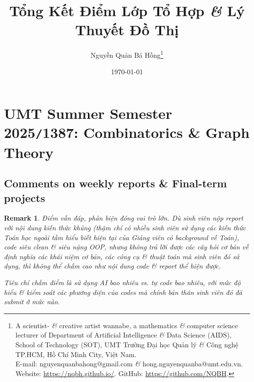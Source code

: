 \documentclass{article}
\title{Tổng Kết Điểm Lớp Tổ Hợp {\it\&} Lý Thuyết Đồ Thị}
\author{Nguyễn Quản Bá Hồng\footnote{A scientist- {\it\&} creative artist wannabe, a mathematics {\it\&} computer science lecturer of Department of Artificial Intelligence {\it\&} Data Science (AIDS), School of Technology (SOT), UMT Trường Đại học Quản lý {\it\&} Công nghệ TP.HCM, Hồ Chí Minh City, Việt Nam.\\E-mail: {\sf nguyenquanbahong@gmail.com} {\it\&} {\sf hong.nguyenquanba@umt.edu.vn}. Website: \url{https://nqbh.github.io/}. GitHub: \url{https://github.com/NQBH}.}}
\date{\today}
\newtheorem{remark}{Remark}
\begin{document}
\maketitle
\tableofcontents


\section{UMT Summer Semester 2025{\tt/}1387: Combinatorics \& Graph Theory}


\subsection{Comments on weekly reports \& Final-term projects}

\begin{remark}
    Điểm vấn đáp, phản biện đóng vai trò lớn. Dù sinh viên nộp report với nội dung kiến thức khủng (thậm chí có nhiều sinh viên sử dụng các kiến thức Toán học ngoài tầm hiểu biết hiện tại của Giảng viên có background về Toán), code siêu clean \& siêu nặng OOP, nhưng không trả lời được các cây hỏi cơ bản về định nghĩa các khái niệm cơ bản, các công cụ \& thuật toán mà sinh viên đó sử dụng, thì không thể chấm cao như nội dung code \& report thể hiện được.

    Tiêu chí chấm điểm là sử dụng AI bao nhiêu vs. tự code bao nhiêu, với mức độ hiểu \& kiểm soát các phương diện của codes mà chính bản thân sinh viên đó đã submit ở mức nào.
\end{remark}
\end{document}
